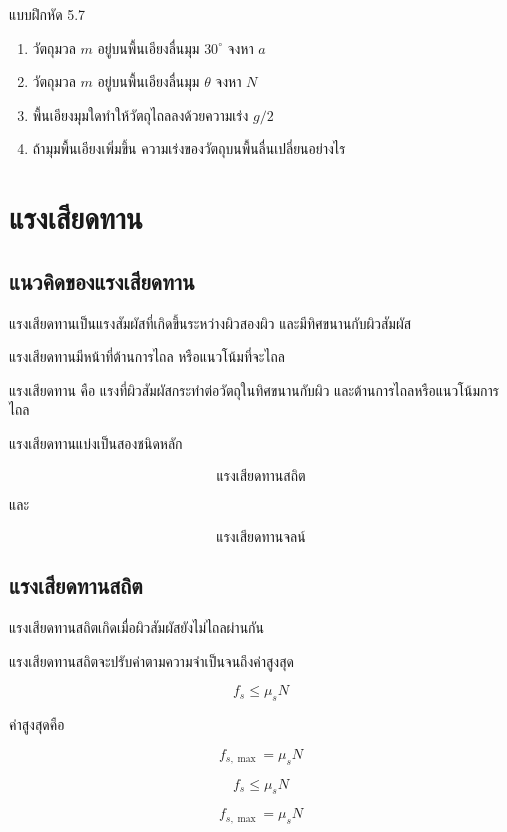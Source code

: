 \begin{exercisebox}{แบบฝึกหัด 5.7}
\begin{enumerate}
    \item วัตถุมวล $m$ อยู่บนพื้นเอียงลื่นมุม $30^\circ$ จงหา $a$
    \item วัตถุมวล $m$ อยู่บนพื้นเอียงลื่นมุม $\theta$ จงหา $N$
    \item พื้นเอียงมุมใดทำให้วัตถุไถลลงด้วยความเร่ง $g/2$
    \item ถ้ามุมพื้นเอียงเพิ่มขึ้น ความเร่งของวัตถุบนพื้นลื่นเปลี่ยนอย่างไร
\end{enumerate}
\end{exercisebox}

\section{แรงเสียดทาน}

\subsection{แนวคิดของแรงเสียดทาน}

แรงเสียดทานเป็นแรงสัมผัสที่เกิดขึ้นระหว่างผิวสองผิว และมีทิศขนานกับผิวสัมผัส

แรงเสียดทานมีหน้าที่ต้านการไถล หรือแนวโน้มที่จะไถล

\begin{tcolorbox}[title=นิยาม]
แรงเสียดทาน คือ แรงที่ผิวสัมผัสกระทำต่อวัตถุในทิศขนานกับผิว และต้านการไถลหรือแนวโน้มการไถล
\end{tcolorbox}

แรงเสียดทานแบ่งเป็นสองชนิดหลัก

\[
\text{แรงเสียดทานสถิต}
\]

และ

\[
\text{แรงเสียดทานจลน์}
\]

\subsection{แรงเสียดทานสถิต}

แรงเสียดทานสถิตเกิดเมื่อผิวสัมผัสยังไม่ไถลผ่านกัน

แรงเสียดทานสถิตจะปรับค่าตามความจำเป็นจนถึงค่าสูงสุด

\[
f_s\leq \mu_s N
\]

ค่าสูงสุดคือ

\[
f_{s,\max}=\mu_s N
\]

\begin{tcolorbox}[title=แรงเสียดทานสถิต]
\[
f_s\leq \mu_s N
\]

\[
f_{s,\max}=\mu_s N
\]
\end{tcolorbox}

